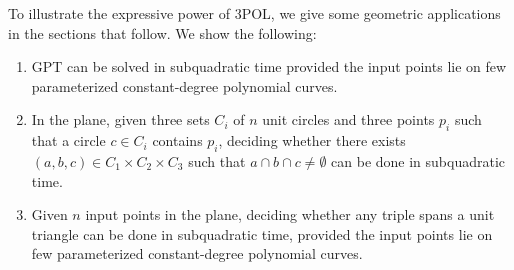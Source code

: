 To illustrate the expressive power of 3POL, we give some geometric
applications in the sections that follow. We show the following:
\begin{enumerate}
\setlength{\itemsep}{0pt}
\setlength{\parskip}{0pt}
\setlength{\parsep}{0pt}
\item GPT can be solved in subquadratic time provided the input points
lie on few parameterized constant-degree polynomial curves.
\item In the plane, given three sets $C_i$ of $n$ unit circles and three points
$p_i$ such that a circle $c \in C_i$ contains $p_i$, deciding whether there
exists $(a,b,c) \in C_1 \times C_2 \times C_3$ such that $a \cap b \cap c
\neq \emptyset$ can be done in subquadratic time.
\item Given $n$ input points in the plane, deciding whether any triple spans a unit
triangle can be done in subquadratic time, provided the input points lie on few
parameterized constant-degree polynomial curves.
\end{enumerate}
